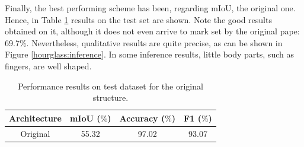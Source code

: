 \begin{table}[h!]
  \begin{center}
    \caption{Performance results  of accuracy (overall and for each class) on the validation set for the original stacked hourglass structure, the original plus different ground truth (GT) resolutions and the original plus the multitask head. }
    \label{hourglass:table2}
  \end{center}
\end{table}

Finally, the best performing scheme has been, regarding mIoU, the original one. Hence, in Table \ref{hourglass:table3} results on the test set are shown. Note the good results obtained on it, although it does not even arrive to mark set by the original pape: 69.7$\%$. Nevertheless, qualitative results are quite precise, as can be shown in Figure \ref{hourglass:inference}. In some inference results, little body parts, such as fingers, are well shaped.\\

\begin{table}[h!]
  \begin{center}
    
    \begin{tabular}{|c|c|c|c|} %
      \textbf{Architecture} & \textbf{mIoU ($\%$)} & \textbf{Accuracy ($\%$)} & \textbf{F1 ($\%$)} \\
      \hline
      Original & 55.32 & 97.02 & 93.07\\
      \hline
    \end{tabular}
    \caption{Performance results on test dataset for the original structure.}
    \label{hourglass:table3}
  \end{center}
\end{table}

